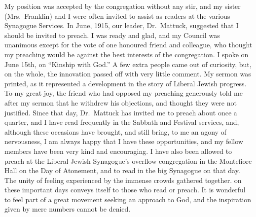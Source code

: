 My position was accepted by the congregation
without any stir, and my sister (Mrs.\ Franklin) and I
were often invited to assist as readers at the various
Synagogue Services. In June, 1915, our leader,
Dr.\ Mattuck, suggested that I should be invited to preach.
I was ready and glad, and my Council was unanimous
except for the vote of one honoured friend and
colleague, who thought my preaching would be against
the best interests of the congregation. I spoke on
June 15th, on “Kinship with God.” A few extra
people came out of curiosity, but, on the whole, the
innovation passed off with very little comment. My
sermon was printed, as it represented a development in
the story of Liberal Jewish progress. To my great joy,
the friend who had opposed my preaching generously
told me after my sermon that he withdrew his objections,
and thought they were not justified. Since that day,
Dr.\ Mattuck has invited me to preach about once a
quarter, and I have read frequently in the Sabbath and
Festival services, and, although these occasions have
brought, and still bring, to me an agony of nervousness,
I am always happy that I have these opportunities, and
my fellow members have been very kind and encouraging.
I have also been allowed to preach at the Liberal Jewish
Synagogue’s overflow congregation in the Montefiore
Hall on the Day of Atonement, and to read in the big
Synagogue on that day. The unity of feeling experienced
by the immense crowds gathered together. on these
important days conveys itself to those who read or
preach. It is wonderful to feel part of a great movement
seeking an approach to God, and the inspiration given
by mere numbers cannot be denied.

